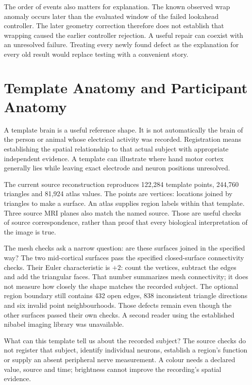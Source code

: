 The order of events also matters for explanation. The known observed wrap anomaly occurs later than the evaluated window of the failed lookahead controller. The later geometry correction therefore does not establish that wrapping caused the earlier controller rejection. A useful repair can coexist with an unresolved failure. Treating every newly found defect as the explanation for every old result would replace testing with a convenient story.

\section{Template Anatomy and Participant Anatomy}

A template brain is a useful reference shape. It is not automatically the brain
of the person or animal whose electrical activity was recorded. Registration
means establishing the spatial relationship to that actual subject with
appropriate independent evidence. A template can illustrate where hand motor
cortex generally lies while leaving exact electrode and neuron positions
unresolved.

The current source reconstruction reproduces 122,284 template points, 244,760
triangles and 81,924 atlas values. The points are vertices: locations joined by
triangles to make a surface. An atlas supplies region labels within that
template. Three source MRI planes also match the named source. Those are useful
checks of source correspondence, rather than proof that every biological
interpretation of the image is true.

The mesh checks ask a narrow question: are these surfaces joined in the
specified way? The two mid-cortical surfaces pass the specified closed-surface
connectivity checks. Their Euler characteristic is $+2$: count the vertices,
subtract the edges and add the triangular faces. That number summarizes mesh
connectivity; it does not measure how closely the shape matches the recorded
subject. The optional region boundary still contains 432 open edges, 838
inconsistent triangle directions and six invalid point neighbourhoods. Those
defects remain even though the other surfaces passed their own checks. A
second reader using the established nibabel imaging library was unavailable.

What can this template tell us about the recorded subject? The source checks
do not register that subject, identify individual neurons, establish a region's
function or supply an absent peripheral nerve measurement. A colour needs a
declared value, source and time; brightness cannot improve the recording's
spatial evidence.

